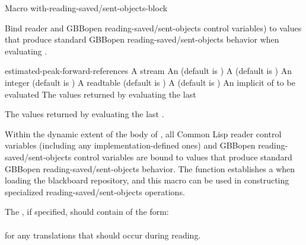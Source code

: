 \documentclass[10pt,twoside,english,pdftex]{article}
\begin{document}
\begin{functiondoc}{Macro}%
  {with-reading-saved/sent-objects-block}%
  {\code{(} 
    }
  
\fnsyntax

\fnpurpose Bind reader and GBBopen reading-saved/sent-objects control
variables) to values that produce standard GBBopen
reading-saved/sent-objects behavior when evaluating .

\fnpackage {}

\fnmodule {}

\fnargs
\begin{args}{estimated-peak-forward-references}
\arg[stream] A stream
 An  (default is \nil)
 A  (default is \nil)
 An integer (default is
  )
\arg[readtable] A readtable (default is 
  )
 A  (default is \nil)
\arg[forms] An implicit  of  to be evaluated
\arg[results] The values returned by evaluating the last 
\end{args}

\fnreturns The values returned by evaluating the last .

\fndescription Within the dynamic extent of the body of ,
all Common Lisp reader control variables (including any implementation-defined
ones) and GBBopen reading-saved/sent-objects control variables are bound to
values that produce standard GBBopen reading-saved/sent-objects behavior.  The
function  establishes a
 when loading the
blackboard repository, and this macro can be used in constructing specialized
reading-saved/sent-objects operations.

The  , if
specified, should contain  of the form:\\
%
~~~~~~~~\\
%
for any  translations that should occur during reading.


\end{functiondoc}
\end{document}
